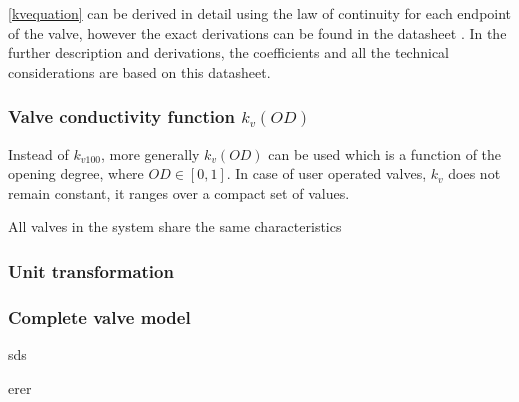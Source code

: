 \eqref{kvequation} can be derived in detail using the law of continuity for each endpoint of the valve, however the exact derivations can be found in the datasheet \cite{kvvalve}. In the further description and derivations, the coefficients and all the technical considerations are based on this datasheet.  

\subsubsection{Valve conductivity function $k_v(OD)$}
\label{OD}

Instead of $k_{v100}$, more generally $k_v(OD)$ can be used which is a function of the opening degree, where $OD \in  [0,1]$. In case of user operated valves, $k_{v}$ does not remain constant, it ranges over a compact set of values. \cite{Kallesoe2009}

All valves in the system share the same characteristics

\subsubsection{Unit transformation}
\label{unittransform}

\subsubsection{Complete valve model}
\label{unittransform}


\cite{kvvalve}
 
sds \cite{valvedatasheet}

erer \cite{keller}
 
 
 